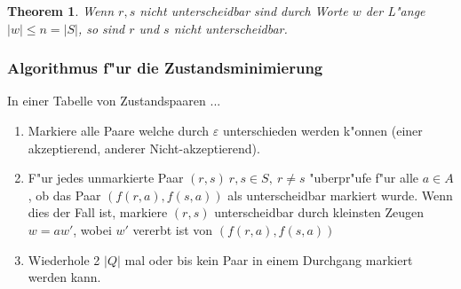 \documentclass[german, 10pt, a4paper, twocolumn]{scrartcl}
\newtheorem{theorem}{Theorem}[section]
\theoremstyle{definition}
\theoremstyle{example}
\begin{document}
\begin{theorem}
	Wenn $r, s$  nicht unterscheidbar sind durch Worte $w$ der L"ange $|w|\leq n = | S |$, so sind $r$ und $s$ nicht unterscheidbar.
\end{theorem}

\subsubsection{Algorithmus f"ur die Zustandsminimierung}

In einer Tabelle von Zustandspaaren ...

\begin{enumerate}
	\item Markiere alle Paare welche durch $\varepsilon$ unterschieden werden k"onnen (einer akzeptierend, anderer Nicht-akzeptierend).
	\item F"ur jedes unmarkierte Paar $(r,s) \ r,s \in S, \ r \neq s$ "uberpr"ufe f"ur alle $a \in A$, ob das Paar $( f(r,a), f(s,a))$ als unterscheidbar markiert wurde. Wenn dies der Fall ist, markiere $(r,s)$ unterscheidbar durch kleinsten Zeugen $w= a w'$, wobei $w'$ vererbt ist von $(f(r,a),f(s,a))$
	\item Wiederhole 2 $|Q|$ mal oder bis kein Paar in einem Durchgang markiert werden kann.
\end{enumerate}
\end{document}
